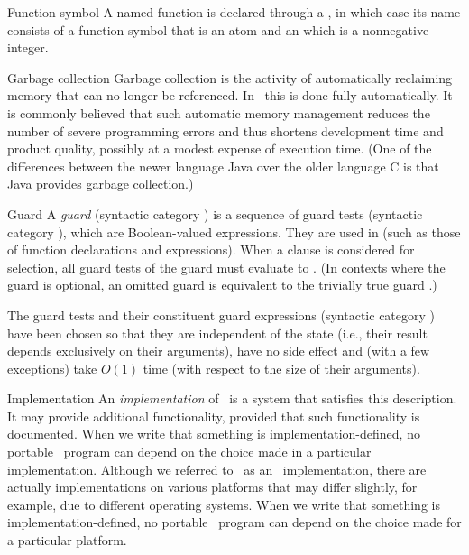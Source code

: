 \begin{Lentry}
\item[Function symbol]
A named function is declared through a ,
in which case its name consists of a function symbol
that is an atom and an  which is a nonnegative integer.

\item[Garbage collection]
Garbage collection is the activity of automatically reclaiming memory
that can no longer be referenced. In \Erlang\ this is done fully
automatically.  It is commonly believed that such automatic memory
management reduces the number of severe programming errors and thus
shortens development time and product quality, possibly at a modest
expense of execution time.  (One of the differences between the newer
language Java \cite{javaspec} over the older language C \cite{iso-c}
is that Java provides garbage collection.)

\item[Guard]
A \emph{guard} (syntactic category ) is a sequence of guard
tests (syntactic category ), which are Boolean-valued
expressions.  They are used in  (such as those of function
declarations and  expressions).  When a clause is
considered for selection, all guard tests of the guard must evaluate
to .  (In contexts where the guard is optional, an omitted
guard is equivalent to the trivially true guard .)

The guard tests and their constituent guard expressions (syntactic
category ) have been chosen so that they are independent
of the state (i.e., their result depends exclusively on their
arguments), have no side effect and (with a few exceptions) take
$O(1)$ time (with respect to the size of their arguments).

\item[Implementation]
\ifStd
{}
An \emph{implementation} of \StdErlang\ is a system that satisfies
this description.  It may provide additional functionality, provided
that such functionality is documented.  When we write that something
is implementation-defined, no portable \StdErlang\ program can depend
on the choice made in a particular implementation.
\else
Although we referred to \OldErlang\ as an \Erlang\ implementation,
there are actually implementations on various platforms that may
differ slightly, for example, due to different operating systems.
When we write that something is implementation-defined, no portable
\OldErlang\ program can depend on the choice made for a particular
platform.
\fi


\end{Lentry}
